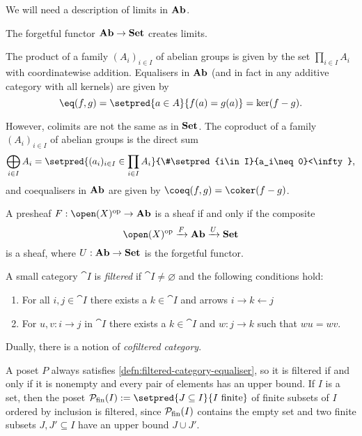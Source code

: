 \documentclass[../main.tex]{subfiles}
\begin{document}
We will need a description of limits in $\mathbf{Ab}$. 

\begin{lem}[name={\cite[Section~\RN{5}.1]{maclane:71}}]
    The forgetful functor $\mathbf{Ab}\to \mathbf{Set}$ creates limits.
\end{lem}

\begin{exmp}
The product of a family \((A_i)_{i\in I}\) of abelian groups is given by the set $\prod_{i\in I} A_i$ with coordinatewise addition.
Equalisers in $\mathbf{Ab}$ (and in fact in any additive category with all kernels) are given by
\[\eq(f,g) = \setpred{a\in A}{f(a) = g(a)} = \ker(f-g)\text{.}\] 

However, colimits are not the same as in $\mathbf{Set}$.
The coproduct of a family \((A_i)_{i\in I}\) of abelian groups is the direct sum
\[\bigoplus_{i\in I} A_i = \setpred{(a_i)_{i\in I} \in \prod_{i\in I} A_i}{\#\setpred{i\in I}{a_i\neq 0}<\infty}\text{,}\]
and coequalisers in $\mathbf{Ab}$ are given by $\coeq(f,g) = \coker(f-g)$.
\end{exmp}

\begin{cor}\label{cor:sheaf-condition-forgetful-functor}
A presheaf $F\colon \open(X)\opp \to \catAbelianGroup$ is a sheaf if and only if the composite
\[ \open(X)\opp\xrightarrow{F} \catAbelianGroup \xrightarrow{U}\catSet \]
is a sheaf, where $U\colon \catAbelianGroup\to\catSet$ is the forgetful functor.
\end{cor}

\begin{defn}\label{defn:filtered-category}
    A small category $\cat I$ is \emph{filtered} if $\cat I\neq \varnothing$ and the following conditions hold:
    \begin{enumerate}
        \item\label{defn:filtered-category:upperbound} For all $i,j\in \cat I$ there exists a $k\in\cat I$ and arrows $i\to k \leftarrow j$
        \item\label{defn:filtered-category-equaliser} For $u,v\colon i\to j$ in $\cat I$ there exists a $k\in \cat I$ and $w\colon j\to k$ such that $wu = wv$.
    \end{enumerate}
    Dually, there is a notion of \emph{cofiltered category}.
\end{defn}

\begin{exmp}
    A poset $P$ always satisfies \cref{defn:filtered-category-equaliser}, so it is filtered if and only if it is nonempty and every pair of elements has an upper bound.
    If $I$ is a set, then the poset $\mathcal P_{\textup{fin}}(I) := \setpred{J\subseteq I}{I\text{ finite}}$ of finite subsets of \(I\) ordered by inclusion is filtered, since $\mathcal P_{\textup{fin}}(I)$ contains the empty set and two finite subsets $J, J'\subseteq I$ have an upper bound $J\cup J'$. 
\end{exmp}
\end{document}
